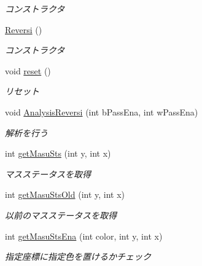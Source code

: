 \begin{DoxyCompactItemize}
\begin{DoxyCompactList}\small\item\em コンストラクタ \end{DoxyCompactList}\item 
\hyperlink{classjp_1_1gr_1_1java__conf_1_1yuta__yoshinaga_1_1reversi_1_1model_1_1_reversi_a26c832c23ff4e38dd2bcf990d05296d6}{Reversi} ()
\begin{DoxyCompactList}\small\item\em コンストラクタ \end{DoxyCompactList}\item 
void \hyperlink{classjp_1_1gr_1_1java__conf_1_1yuta__yoshinaga_1_1reversi_1_1model_1_1_reversi_a497552844cbae36207f2d8c836a26b8e}{reset} ()
\begin{DoxyCompactList}\small\item\em リセット \end{DoxyCompactList}\item 
void \hyperlink{classjp_1_1gr_1_1java__conf_1_1yuta__yoshinaga_1_1reversi_1_1model_1_1_reversi_a43098c043d0424bb5e5e60db358a324d}{Analysis\+Reversi} (int b\+Pass\+Ena, int w\+Pass\+Ena)
\begin{DoxyCompactList}\small\item\em 解析を行う \end{DoxyCompactList}\item 
int \hyperlink{classjp_1_1gr_1_1java__conf_1_1yuta__yoshinaga_1_1reversi_1_1model_1_1_reversi_aaab64f3b70ed5da5f0707933cbf82802}{get\+Masu\+Sts} (int y, int x)
\begin{DoxyCompactList}\small\item\em マスステータスを取得 \end{DoxyCompactList}\item 
int \hyperlink{classjp_1_1gr_1_1java__conf_1_1yuta__yoshinaga_1_1reversi_1_1model_1_1_reversi_a051aca9eb7ac3ce375a6c017fd0eb400}{get\+Masu\+Sts\+Old} (int y, int x)
\begin{DoxyCompactList}\small\item\em 以前のマスステータスを取得 \end{DoxyCompactList}\item 
int \hyperlink{classjp_1_1gr_1_1java__conf_1_1yuta__yoshinaga_1_1reversi_1_1model_1_1_reversi_a055f20327e781b1f6807dba0baa1e51b}{get\+Masu\+Sts\+Ena} (int color, int y, int x)
\begin{DoxyCompactList}\small\item\em 指定座標に指定色を置けるかチェック \end{DoxyCompactList}\item 

\end{DoxyCompactItemize}
